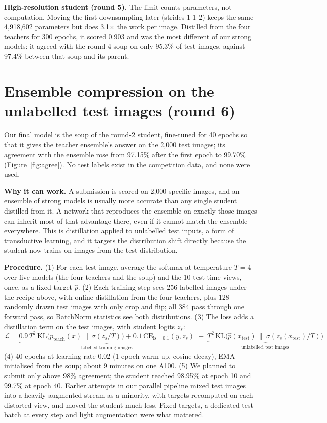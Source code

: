 \documentclass[11pt]{article}
\begin{document}
\textbf{High-resolution student (round 5).} The limit counts parameters, not computation. Moving the first downsampling later (strides 1-1-2) keeps the same 4,918,602 parameters but does 3.1$\times$ the work per image. Distilled from the four teachers for 300 epochs, it scored 0.903 and was the most different of our strong models: it agreed with the round-4 soup on only 95.3\% of test images, against 97.4\% between that soup and its parent.

\section{Ensemble compression on the unlabelled test images (round 6)}
Our final model is the soup of the round-2 student, fine-tuned for 40 epochs so that it gives the teacher ensemble's answer on the 2,000 test images; its agreement with the ensemble rose from 97.15\% after the first epoch to 99.70\% (Figure~\ref{fig:agree}). No test labels exist in the competition data, and none were used.

\textbf{Why it can work.} A submission is scored on 2,000 specific images, and an ensemble of strong models is usually more accurate than any single student distilled from it. A network that reproduces the ensemble on exactly those images can inherit most of that advantage there, even if it cannot match the ensemble everywhere. This is distillation applied to unlabelled test inputs, a form of transductive learning, and it targets the distribution shift directly because the student now trains on images from the test distribution.

\textbf{Procedure.} (1) For each test image, average the softmax at temperature $T=4$ over five models (the four teachers and the soup) and the 10 test-time views, once, as a fixed target $\hat{p}$. (2) Each training step sees 256 labelled images under the recipe above, with online distillation from the four teachers, plus 128 randomly drawn test images with only crop and flip; all 384 pass through one forward pass, so BatchNorm statistics see both distributions. (3) The loss adds a distillation term on the test images, with student logits $z_s$:
\begin{equation*}
\mathcal{L} = \underbrace{0.9\,T^2\,\mathrm{KL}\big(\bar{p}_{\text{teach}}(x)\,\|\,\sigma(z_s/T)\big) + 0.1\,\mathrm{CE}_{\text{ls}=0.1}(y, z_s)}_{\text{labelled training images}} \;+\; \underbrace{T^2\,\mathrm{KL}\big(\hat{p}(x_{\text{test}})\,\|\,\sigma(z_s(x_{\text{test}})/T)\big)}_{\text{unlabelled test images}}
\end{equation*}
(4) 40 epochs at learning rate 0.02 (1-epoch warm-up, cosine decay), EMA initialised from the soup; about 9 minutes on one A100. (5) We planned to submit only above 98\% agreement; the student reached 98.95\% at epoch 10 and 99.7\% at epoch 40. Earlier attempts in our parallel pipeline mixed test images into a heavily augmented stream as a minority, with targets recomputed on each distorted view, and moved the student much less. Fixed targets, a dedicated test batch at every step and light augmentation were what mattered.
\end{document}
